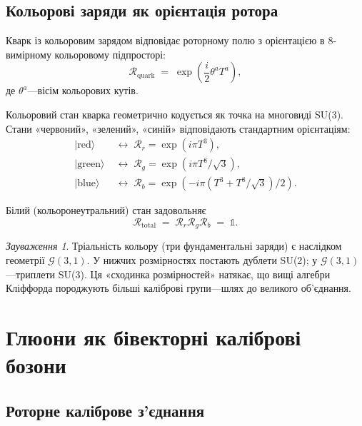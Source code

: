 \documentclass[11pt,a4paper]{article}
\newcommand{\Rotor}{\mathcal{R}}
\newcommand{\Cl}{\mathcal{G}}
\theoremstyle{definition}
\theoremstyle{plain}
\theoremstyle{remark}
\newtheorem{remark}{Зауваження}[section]
\begin{document}
\subsection{Кольорові заряди як орієнтація ротора}

Кварк із кольоровим зарядом відповідає роторному полю з орієнтацією в 8-вимірному кольоровому підпросторі:
\begin{equation}
\Rotor_{\mathrm{quark}} \;=\; \exp\left(\frac{i}{2}\theta^a T^a\right),
\label{eq:quark-rotor}
\end{equation}
де $\theta^a$—вісім кольорових кутів.

Кольоровий стан кварка геометрично кодується як точка на многовиді SU(3). Стани «червоний», «зелений», «синій» відповідають стандартним орієнтаціям:
\begin{align}
|\mathrm{red}\rangle &\;\leftrightarrow\; \Rotor_r = \exp(i\pi T^3), \\
|\mathrm{green}\rangle &\;\leftrightarrow\; \Rotor_g = \exp(i\pi T^8/\sqrt{3}), \\
|\mathrm{blue}\rangle &\;\leftrightarrow\; \Rotor_b = \exp(-i\pi(T^3 + T^8/\sqrt{3})/2).
\end{align}

Білий (кольоронеутральний) стан задовольняє
\begin{equation}
\Rotor_{\mathrm{total}} \;=\; \Rotor_r \Rotor_g \Rotor_b \;=\; \mathbb{1}.
\end{equation}

\begin{remark}
Тріальність кольору (три фундаментальні заряди) є наслідком геометрії $\Cl(3,1)$. У нижчих розмірностях постають дублети SU(2); у $\Cl(3,1)$—триплети SU(3). Ця «сходинка розмірностей» натякає, що вищі алгебри Кліффорда породжують більші каліброві групи—шлях до великого об’єднання.
\end{remark}

\vspace{1em}

\section{Глюони як бівекторні каліброві бозони}
\label{sec:gluons}

\subsection{Роторне каліброве з’єднання}
\end{document}
